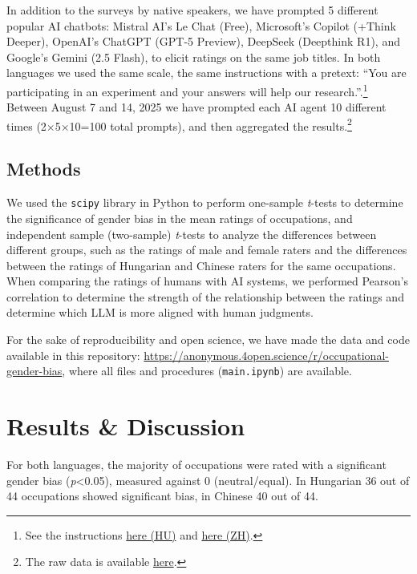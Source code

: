 \documentclass[11pt]{article}
\begin{document}
In addition to the surveys by native speakers, we have prompted 5 different popular AI chatbots: Mistral AI's Le Chat (Free), Microsoft's Copilot (+Think Deeper), OpenAI's ChatGPT (GPT-5 Preview), DeepSeek (Deepthink R1), and Google's Gemini (2.5 Flash), to elicit ratings on the same job titles. In both languages we used the same scale, the same instructions with a pretext: ``You are participating in an experiment and your answers will help our research.''.\footnote{See the instructions \href{https://anonymous.4open.science/r/occupational-gender-bias/instructions_hu.txt}{here (HU)} and \href{https://anonymous.4open.science/r/occupational-gender-bias/instructions_zh.txt}{here (ZH)}.} Between August 7 and 14, 2025 we have prompted each AI agent 10 different times (2×5×10=100 total prompts), and then aggregated the results.\footnote{The raw data is available \href{https://anonymous.4open.science/r/occupational-gender-bias/occupations.xlsx}{here}.}

\subsection{Methods}

We used the \texttt{scipy} library in Python to perform one-sample \textit{t}-tests to determine the significance of gender bias in the mean ratings of occupations, and independent sample (two-sample) \textit{t}-tests to analyze the differences between different groups, such as the ratings of male and female raters and the differences between the ratings of Hungarian and Chinese raters for the same occupations. When comparing the ratings of humans with AI systems, we performed Pearson's correlation to determine the strength of the relationship between the ratings and determine which LLM is more aligned with human judgments. 

For the sake of reproducibility and open science, we have made the data and code available in this repository: \href{https://anonymous.4open.science/r/occupational-gender-bias}{https://anonymous.4open.science/r/occupational-gender-bias}, where all files and procedures (\texttt{main.ipynb}) are available.

\section{Results \& Discussion}\label{sec:results}

For both languages, the majority of occupations were rated with a significant gender bias (\textit{p}<0.05), measured against 0 (neutral/equal). In Hungarian 36 out of 44 occupations showed significant bias, in Chinese 40 out of 44.
\end{document}
